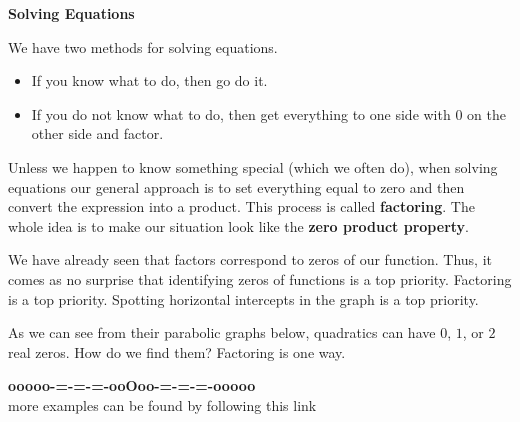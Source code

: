 \documentclass{ximera}
\begin{document}
\begin{procedure}  \textbf{\textcolor{blue!55!black}{Solving Equations}}

We have two methods for solving equations.

\begin{itemize}
     \item If you know what to do, then go do it. \\
     \item If you do not know what to do, then get everything to one side with $0$ on the other side and factor.
\end{itemize}


Unless we happen to know something special (which we often do), when solving equations our general approach is to set everything equal to zero and then convert the expression into a product.  This process is called \textbf{factoring}.  The whole idea is to make our situation look like the \textbf{zero product property}.

\end{procedure}






We have already seen that factors correspond to zeros of our function. Thus, it comes as no surprise that identifying zeros of functions is a top priority.  Factoring is a top priority. Spotting horizontal intercepts in the graph is a top priority.

As we can see from their parabolic graphs below, quadratics can have $0$, $1$, or $2$ real zeros.  How do we find them? Factoring is one way.  











\begin{center}
\textbf{\textcolor{green!50!black}{ooooo-=-=-=-ooOoo-=-=-=-ooooo}} \\

more examples can be found by following this link\\ 

\end{center}
\end{document}
